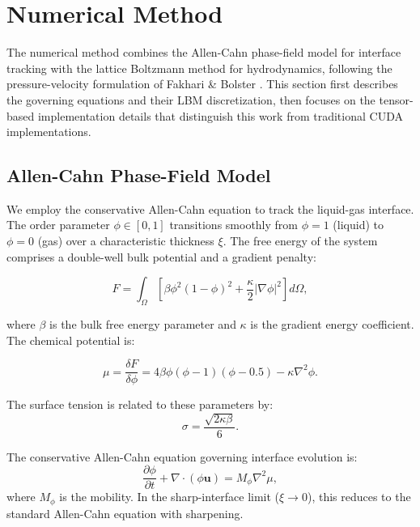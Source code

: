 \section{Numerical Method}
\label{sec:method}

The numerical method combines the Allen-Cahn phase-field model for interface tracking with the lattice Boltzmann method for hydrodynamics, following the pressure-velocity formulation of Fakhari \& Bolster \cite{fakhari2017diffuse}. This section first describes the governing equations and their LBM discretization, then focuses on the tensor-based implementation details that distinguish this work from traditional CUDA implementations.

\subsection{Allen-Cahn Phase-Field Model}

We employ the conservative Allen-Cahn equation to track the liquid-gas interface. The order parameter $\phi \in [0,1]$ transitions smoothly from $\phi = 1$ (liquid) to $\phi = 0$ (gas) over a characteristic thickness $\xi$. The free energy of the system comprises a double-well bulk potential and a gradient penalty:

\begin{equation}
    F = \int_\Omega \left[ \beta \phi^2(1-\phi)^2 + \frac{\kappa}{2} |\nabla \phi|^2 \right] d\Omega,
    \label{eq:free_energy}
\end{equation}

where $\beta$ is the bulk free energy parameter and $\kappa$ is the gradient energy coefficient. The chemical potential is:

\begin{equation}
    \mu = \frac{\delta F}{\delta \phi} = 4\beta \phi(\phi-1)(\phi-0.5) - \kappa \nabla^2 \phi.
    \label{eq:chemical_potential}
\end{equation}

The surface tension is related to these parameters by:
\begin{equation}
    \sigma = \frac{\sqrt{2\kappa\beta}}{6}.
    \label{eq:surface_tension}
\end{equation}

The conservative Allen-Cahn equation governing interface evolution is:
\begin{equation}
    \frac{\partial \phi}{\partial t} + \nabla \cdot (\phi \mathbf{u}) = M_\phi \nabla^2 \mu,
    \label{eq:ac_conservative}
\end{equation}
where $M_\phi$ is the mobility. In the sharp-interface limit ($\xi \to 0$), this reduces to the standard Allen-Cahn equation with sharpening.

